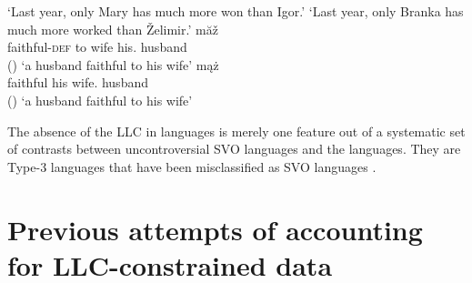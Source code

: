 \documentclass[output=paper
  ,nobabel
  ,uniformtopskip %
]{langscibook}
\begin{document}


\eal
\ex 
{}
\glt `Last year, only Mary has much more won than Igor.'
\ex 
{}
\glt `Last year, only Branka has much more worked than Želimir.'
\ex 
{} măž\\
     \spacebr{}faithful-\textsc{def}  \spacebr{}to wife his. husband\\\hfill()
\glt `a husband faithful to his wife'
\ex 
{} mąż\\
     \spacebr{}faithful \spacebr{}his wife.\dat{} husband\\\hfill()
\glt `a husband faithful to his wife'
\zl

\noindent
The absence of the LLC in  languages is merely one feature out of a systematic set of contrasts between uncontroversial SVO languages and the  languages. They are Type-3 languages that have been misclassified as SVO languages \citep{HaiderSzucsich2022a,SzucsichHaider2015}.

\section{Previous attempts of accounting for LLC-constrained data}\label{sec-preattempts}
\end{document}
